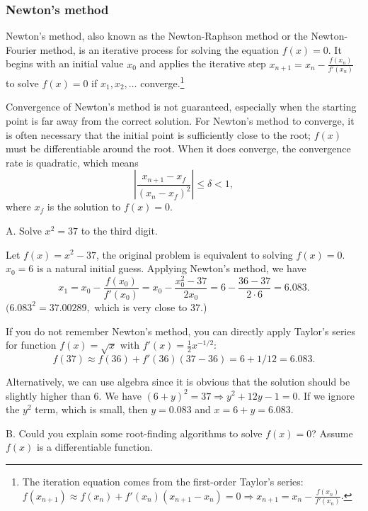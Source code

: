 \subsubsection*{Newton's method}

Newton's method, also known as the Newton-Raphson method or the Newton-Fourier method, is an iterative process for solving the equation \(f(x)=0\). It begins with an initial value \(x_0\) and applies the iterative step \(x_{n+1}=x_n-\frac{f(x_n)}{f'(x_n)}\) to solve \(f(x)=0\) if \(x_1,x_2,\ldots\) converge.\footnote[4]{The iteration equation comes from the first-order Taylor's series: \(f(x_{n+1})\approx f(x_n)+f'(x_n)(x_{n+1}-x_n)=0\Rightarrow x_{n+1}=x_n-\frac{f(x_n)}{f'(x_n)}\).}

Convergence of Newton's method is not guaranteed, especially when the starting point is far away from the correct solution. For Newton's method to converge, it is often necessary that the initial point is sufficiently close to the root; \(f(x)\) must be differentiable around the root. When it does converge, the convergence rate is quadratic, which means
\[
\left|\frac{x_{n+1}-x_f}{(x_n-x_f)^2}\right|\le\delta<1,
\]
where \(x_f\) is the solution to \(f(x)=0\).

\begin{problem}{A. Solve \(x^2=37\) to the third digit.}
\end{problem}

\begin{solution}
Let \(f(x)=x^2-37\), the original problem is equivalent to solving \(f(x)=0\). \(x_0=6\) is a natural initial guess. Applying Newton's method, we have
\[
x_1=x_0-\frac{f(x_0)}{f'(x_0)}=x_0-\frac{x_0^2-37}{2x_0}=6-\frac{36-37}{2\cdot 6}=6.083.
\]
\((6.083^2=37.00289,\) which is very close to 37.)

If you do not remember Newton's method, you can directly apply Taylor's series for function \(f(x)=\sqrt{x}\) with \(f'(x)=\tfrac{1}{2}x^{-1/2}\):
\[
f(37)\approx f(36)+f'(36)(37-36)=6+1/12=6.083.
\]

Alternatively, we can use algebra since it is obvious that the solution should be slightly higher than 6. We have \((6+y)^2=37\Rightarrow y^2+12y-1=0.\) If we ignore the \(y^2\) term, which is small, then \(y=0.083\) and \(x=6+y=6.083.\)
\end{solution}

\begin{problem}{B. Could you explain some root-finding algorithms to solve \(f(x)=0\)? Assume \(f(x)\) is a differentiable function.}
\end{problem}

